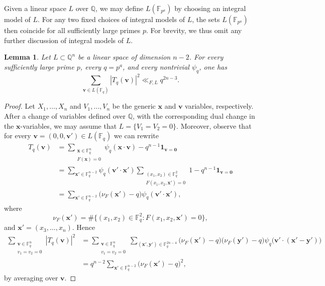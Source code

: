 \documentclass[a4paper,11pt, twoside,reqno]{amsart}
\theoremstyle{plain}
\newtheorem{lemma}[thm]{Lemma}
\theoremstyle{definition}
\theoremstyle{remark}
\newcommand{\F}{\mathbb{F}}
\newcommand{\bfv}{\bm{v}}
\newcommand{\bfx}{\bm{x}}
\newcommand{\bfy}{\bm{y}}
\newcommand{\QQ}{\mathbb{Q}}
\newcommand{\FF}{\mathbb{F}}
\numberwithin{equation}{section}
\begin{document}
Given a linear space $L$ over $\QQ$,
we may define $L(\FF_{p^a})$ by choosing an integral model of $L$.
For any two fixed choices of integral models of $L$,
the sets $L(\FF_{p^a})$ then coincide for all sufficiently large primes $p$.
For brevity, we thus omit any further discussion of integral models of $L$.

\begin{lemma}
\label{n10:second-moment}
Let $L\subset\QQ^n$ be a linear space of dimension $n-2$.
For every sufficiently large prime $p$, every $q=p^a$, and every
nontrivial $\psi_q$, one has
\begin{equation}
 \sum_{\bfv\in L(\FF_q)}|T_q(\bfv)|^2\ll_{F,L}q^{2n-3}.
 \label{n10:moment-two}
\end{equation}
\end{lemma}
\begin{proof}
Let $X_1,\dots,X_n$ and $V_1,\dots,V_n$ be the generic $\bfx$ and $\bfv$ variables, respectively.
After a change of variables defined over $\QQ$, with the corresponding dual change in the $\bfx$-variables, we may assume that $L=\{V_1=V_2=0\}$.
Moreover, observe that for every $\bfv=(0,0,\bfv')\in L(\FF_q)$ we can rewrite
\[
\begin{aligned}
T_q(\bfv)
&=\sum_{\substack{\bfx\in\FF_q^n\\F(\bfx)=0}}
  \psi_q(\bfx\cdot\bfv)-q^{n-1}\bm{1}_{\bfv=\bm0}\\
&=\sum_{\bfx'\in\FF_q^{n-2}}\psi_q(\bfv'\cdot\bfx')
  \sum_{\substack{(x_1,x_2)\in\FF_q^2\\F(x_1,x_2,\bfx')=0}}1
  -q^{n-1}\bm{1}_{\bfv=\bm0}\\
&=\sum_{\bfx'\in\FF_q^{n-2}}
  \bigl(\nu_F(\bfx')-q\bigr)\psi_q(\bfv'\cdot\bfx'),
\end{aligned}
\]
where
\[
\nu_F(\bfx')=\#\{(x_1,x_2)\in\FF_q^2:F(x_1,x_2,\bfx')=0\},
\]
and $\bfx'=(x_3,\ldots,x_n)$. Hence
\begin{equation*}
\begin{split}
\sum_{\substack{\bfv\in\FF_q^n\\v_1=v_2=0}}|T_q(\bfv)|^2
&=\sum_{\substack{\bfv\in\FF_q^n\\v_1=v_2=0}}
\sum_{(\bfx',\bfy')\in\FF_q^{2n-4}}
\bigl(\nu_F(\bfx')-q\bigr)\bigl(\nu_F(\bfy')-q\bigr)
\psi_q\bigl(\bfv'\cdot(\bfx'-\bfy')\bigr) \\
&= q^{n-2}\sum_{\bfx'\in\FF_q^{n-2}} \bigl(\nu_F(\bfx')-q\bigr)^2,
\end{split}
\end{equation*}
by averaging over $\bfv$.


\end{proof}
\end{document}
